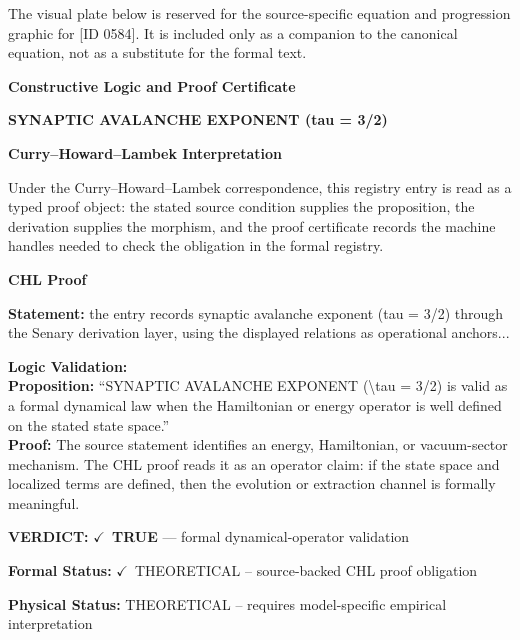 \begingroup\footnotesize\sloppy
The visual plate below is reserved for the source-specific equation and progression graphic for [ID 0584]. It is included only as a companion to the canonical equation, not as a substitute for the formal text.
\par\endgroup
\ifTZPDarkEdition
{}
\fi

\clearpage
\begingroup\tzpsupportsetup
\noindent\textbf{\fontsize{10.8pt}{12.8pt}\selectfont [ID 0584] Constructive Logic and Proof Certificate}\par
\noindent\textbf{\fontsize{10pt}{12pt}\selectfont SYNAPTIC AVALANCHE EXPONENT (tau = 3/2)}\par
\vspace{0.45em}
\begingroup
\footnotesize
\setlength{\parskip}{0.22em}
\setlength{\parindent}{0pt}
\noindent\textbf{Curry--Howard--Lambek Interpretation}\par
Under the Curry--Howard--Lambek correspondence, this registry entry is read as a typed proof
object: the stated source condition supplies the proposition, the derivation supplies the
morphism, and the proof certificate records the machine handles needed to check the obligation
in the formal registry.

\vspace{0.45em}
\noindent\textbf{CHL Proof}\par
\textbf{Statement:} the entry records synaptic avalanche exponent (tau = 3/2) through the Senary derivation
layer, using the displayed relations as operational anchors...

\textbf{Logic Validation:}\\
\textbf{Proposition:} ``SYNAPTIC AVALANCHE EXPONENT (\textbackslash{}tau = 3/2) is valid as a formal dynamical law when the
Hamiltonian or energy operator is well defined on the stated state space.''\\
\textbf{Proof:} The source statement identifies an energy, Hamiltonian, or vacuum-sector mechanism. The
CHL proof reads it as an operator claim: if the state space and localized terms are
defined, then the evolution or extraction channel is formally meaningful.

\textbf{VERDICT:} \ensuremath{\checkmark}\ \textbf{TRUE} --- formal dynamical-operator validation

\textbf{Formal Status:} \ensuremath{\checkmark}\ THEORETICAL -- source-backed CHL proof obligation

\textbf{Physical Status:} THEORETICAL -- requires model-specific empirical interpretation
\par\vspace{0.45em}
\par
\ifTZPDarkEdition
{}
\fi
\endgroup
\endgroup
